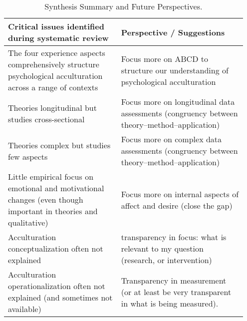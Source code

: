 \begin{table}%
\caption{Synthesis Summary and Future Perspectives.}
\label{tab:SummaryTbl} 
\begin{tabular}{>{\raggedright\arraybackslash}p{0.45\linewidth} 
>{\raggedright\arraybackslash}p{0.50\linewidth}}
\hline 
Critical issues identified during systematic review &
Perspective / Suggestions \\ 
\hline

\vspace{-0.5em} The four experience aspects comprehensively structure psychological acculturation across a range of contexts & 
\vspace{-0.5em} Focus more on ABCD to structure our understanding of psychological acculturation                     \\ 

\vspace{-0.5em} Theories longitudinal but studies cross-sectional & 
\vspace{-0.5em} Focus more on longitudinal data assessments (congruency between theory–method–application)            \\ 

\vspace{-0.5em} Theories complex but studies few aspects & 
\vspace{-0.5em} Focus more on complex data assessments (congruency between theory–method–application)                 \\ 

\vspace{-0.5em} Little empirical focus on emotional and motivational changes (even though important in theories and qualitative) & 
\vspace{-0.5em} Focus more on internal aspects of affect and desire (close the gap)                                   \\ 

\vspace{-0.5em} Acculturation conceptualization often not explained & 
\vspace{-0.5em} transparency in focus: what is relevant to my question (research, or intervention)                    \\ 

\vspace{-0.5em} Acculturation operationalization often not explained (and sometimes not available) & 
\vspace{-0.5em} Transparency in measurement (or at least be very transparent in what is being measured).              \\ 


\end{tabular}
\end{table}
